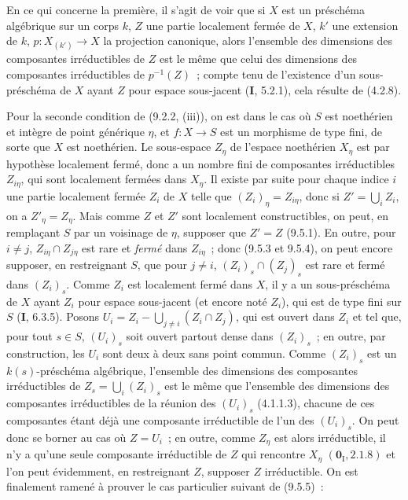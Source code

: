 En ce qui concerne la première, il s'agit de voir que si $X$ est un préschéma
algébrique sur un corps $k$, $Z$ une partie localement fermée de $X$, $k'$ une
extension de $k$, $p:X_{(k')}\to X$ la projection canonique, alors l'ensemble
des dimensions des composantes irréductibles de $Z$ est le même que celui des
dimensions des composantes irréductibles de $p^{-1}(Z)$~; compte tenu de
l'existence d'un sous-préschéma de $X$ ayant $Z$ pour espace sous-jacent
(\textbf{I}, 5.2.1), cela résulte de (4.2.8).

Pour la seconde condition de (9.2.2, (iii)), on est dans le cas où $S$ est
noethérien et intègre de point générique $\eta$, et $f:X\to S$ est un
morphisme de type fini, de sorte que $X$ est noethérien. Le sous-espace
$Z_\eta$ de l'espace noethérien $X_\eta$ est par hypothèse localement fermé,
donc a un nombre fini de composantes irréductibles $Z_{i\eta}$, qui sont
localement fermées dans $X_\eta$. Il existe par suite pour chaque indice $i$
une partie localement fermée $Z_i$ de $X$ telle que $(Z_i)_\eta=Z_{i\eta}$,
donc si $Z'=\bigcup_i Z_i$, on a $Z'_\eta=Z_\eta$. Mais comme $Z$ et $Z'$ sont
localement constructibles, on peut, en remplaçant $S$ par un voisinage de
$\eta$, supposer que $Z'=Z$ (9.5.1). En outre, pour $i\neq j$,
$Z_{i\eta}\cap Z_{j\eta}$ est rare et \emph{fermé} dans $Z_{i\eta}$~; donc
(9.5.3 et 9.5.4), on peut encore supposer, en restreignant $S$, que pour
$j\neq i$, $(Z_i)_s\cap(Z_j)_s$ est rare et fermé dans $(Z_i)_s$. Comme $Z_i$
est localement fermé dans $X$, il y a un sous-préschéma de $X$ ayant $Z_i$
pour espace sous-jacent (et encore noté $Z_i$), qui est de type fini sur
$S$ (\textbf{I}, 6.3.5). Posons
$U_i=Z_i-\bigcup_{j\neq i}(Z_i\cap Z_j)$, qui est ouvert dans $Z_i$ et tel que,
pour tout $s\in S$, $(U_i)_s$ soit ouvert partout dense dans $(Z_i)_s$~; en
outre, par construction, les $U_i$ sont deux à deux sans point commun. Comme
$(Z_i)_s$ est un $k(s)$-préschéma algébrique, l'ensemble des dimensions des
composantes irréductibles de $Z_s=\bigcup_i(Z_i)_s$ est le même que l'ensemble
des dimensions des composantes irréductibles de la réunion des $(U_i)_s$
(4.1.1.3), chacune de ces composantes étant déjà une composante irréductible
de l'un des $(U_i)_s$. On peut donc se borner au cas où $Z=U_i$~; en outre,
comme $Z_\eta$ est alors irréductible, il n'y a qu'une seule composante
irréductible de $Z$ qui rencontre $X_\eta$ $(\mathbf 0_{\mathrm I},2.1.8)$ et
l'on peut évidemment, en restreignant $Z$, supposer $Z$ irréductible. On est
finalement ramené à prouver le cas particulier suivant de (9.5.5)~:

